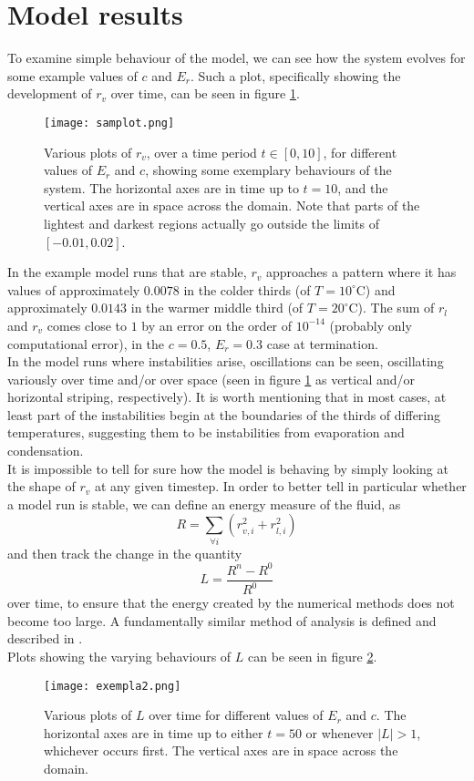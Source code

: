 \documentclass[11pt]{article}
\begin{document}
\section{Model results}
To examine simple behaviour of the model, we can see how the system evolves for some example values of $c$ and $E_r$. Such a plot, specifically showing the development of $r_v$ over time, can be seen in figure \ref{fig:samplot}.
\begin{figure}[H]
\centering
\texttt{[image: samplot.png]}
\caption{Various plots of $r_v$, over a time period $t\in[0,10]$, for different values of $E_r$ and $c$, showing some exemplary behaviours of the system. The horizontal axes are in time up to $t=10$, and the vertical axes are in space across the domain. Note that parts of the lightest and darkest regions actually go outside the limits of $[-0.01,0.02]$.}
\label{fig:samplot}
\end{figure}
In the example model runs that are stable, $r_v$ approaches a pattern where it has values of approximately $0.0078$ in the colder thirds (of $T=10^{\circ}$C) and approximately $0.0143$ in the warmer middle third (of $T=20^{\circ}$C). The sum of $r_l$ and $r_v$ comes close to $1$ by an error on the order of $10^{-14}$ (probably only computational error), in the $c=0.5$, $E_r=0.3$ case at termination. \\
In the model runs where instabilities arise, oscillations can be seen, oscillating variously over time and/or over space (seen in figure \ref{fig:samplot} as vertical and/or horizontal striping, respectively). It is worth mentioning that in most cases, at least part of the instabilities begin at the boundaries of the thirds of differing temperatures, suggesting them to be instabilities from evaporation and condensation. \\
It is impossible to tell for sure how the model is behaving by simply looking at the shape of $r_v$ at any given timestep. In order to better tell in particular whether a model run is stable, we can define an energy measure of the fluid, as
\[
R = \sum_{\forall i}\left(r_{v,i}^2+r_{l,i}^2\right)
\]
and then track the change in the quantity
\[
L = \frac{R^n - R^0}{R^0}
\]
over time, to ensure that the energy created by the numerical methods does not become too large. A fundamentally similar method of analysis is defined and described in \citet[p.~94]{Durran2010}. \\
Plots showing the varying behaviours of $L$ can be seen in figure \ref{fig:exempla2}.
\begin{figure}[H]
\centering
\texttt{[image: exempla2.png]}
\caption{Various plots of $L$ over time for different values of $E_r$ and $c$. The horizontal axes are in time up to either $t=50$ or whenever $|L|>1$, whichever occurs first. The vertical axes are in space across the domain.}
\label{fig:exempla2}
\end{figure}
\end{document}
